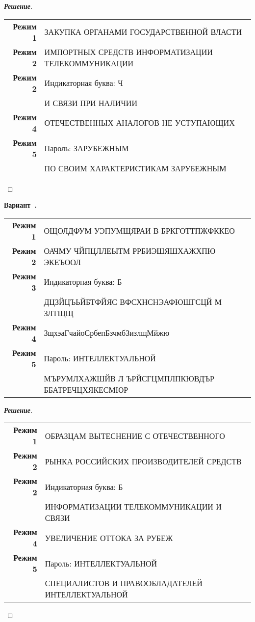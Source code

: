 \documentclass[a4paper,14pt]{extarticle}
\newcounter{exercise}[section]
\newenvironment{exercise}[1][]{\refstepcounter{exercise}\par\medskip
   \noindent\textbf{Вариант~\theexercise. #1}\\
   \noindent\makebox[\linewidth]{\rule{\textwidth}{1.25pt}}
   }
{\vspace{-2.5px}\mbox{}\newline \noindent\makebox[\linewidth]{\rule{\textwidth}{.5pt}}
}
\newenvironment{solution}
{\begin{proof}[\textbf{\textit{Решение}}]}
  {\end{proof}}
\begin{document}
\begin{solution}
\begin{table}[H]
	\centering
	\begin{tabular}{r l}\textbf{Режим 1}  & ЗАКУПКА ОРГАНАМИ ГОСУДАРСТВЕННОЙ ВЛАСТИ \\ 
\textbf{Режим 2}  & ИМПОРТНЫХ СРЕДСТВ ИНФОРМАТИЗАЦИИ ТЕЛЕКОММУНИКАЦИИ \\ 
\textbf{Режим 2}  & Индикаторная буква: Ч \\ 
& И СВЯЗИ ПРИ НАЛИЧИИ \\ 
\textbf{Режим 4}  & ОТЕЧЕСТВЕННЫХ АНАЛОГОВ НЕ УСТУПАЮЩИХ \\ 
\textbf{Режим 5}  & Пароль: ЗАРУБЕЖНЫМ \\ 
& ПО СВОИМ ХАРАКТЕРИСТИКАМ ЗАРУБЕЖНЫМ \\ 
	\end{tabular} 
\end{table}

\end{solution}
\begin{exercise}\begin{table}[H]
	\centering
	\begin{tabular}{r l}\textbf{Режим 1}  & ОЩОЛДФУМ УЭПУМЩЯРАИ В БРКГОТТПЖФККЕО \\ 
\textbf{Режим 2}  & ОАЧМУ ЧЙПЦЛЛЕЫТМ РРБИЭШЯШХАЖХПЮ ЭКЕЪООЛ \\ 
\textbf{Режим 3}  & Индикаторная буква: Б \\ 
& ДЦЗЙЦЪЬЙБТФЙЯС ВФСХНСНЭАФЮШГСЦЙ М ЗЛТЩЩ \\ 
\textbf{Режим 4}  & ЗщхэаГчайоСрбепБзчмбЗизлщМйжю \\ 
\textbf{Режим 5}  & Пароль: ИНТЕЛЛЕКТУАЛЬНОЙ \\ 
& МЪРУМЛХАЖШЙВ Л ЪРЙСГЦМПЛПКЮВДЪР ББАТРЕЧЦХЯКЕСМЮР \\ 
	\end{tabular} 
\end{table}

\end{exercise}
\begin{solution}
\begin{table}[H]
	\centering
	\begin{tabular}{r l}\textbf{Режим 1}  & ОБРАЗЦАМ ВЫТЕСНЕНИЕ С ОТЕЧЕСТВЕННОГО \\ 
\textbf{Режим 2}  & РЫНКА РОССИЙСКИХ ПРОИЗВОДИТЕЛЕЙ СРЕДСТВ \\ 
\textbf{Режим 2}  & Индикаторная буква: Б \\ 
& ИНФОРМАТИЗАЦИИ ТЕЛЕКОММУНИКАЦИИ И СВЯЗИ \\ 
\textbf{Режим 4}  & УВЕЛИЧЕНИЕ ОТТОКА ЗА РУБЕЖ \\ 
\textbf{Режим 5}  & Пароль: ИНТЕЛЛЕКТУАЛЬНОЙ \\ 
& СПЕЦИАЛИСТОВ И ПРАВООБЛАДАТЕЛЕЙ ИНТЕЛЛЕКТУАЛЬНОЙ \\ 
	\end{tabular} 
\end{table}

\end{solution}
\end{document}
